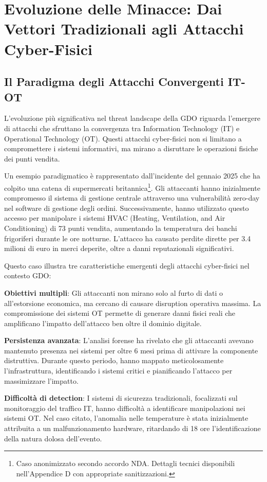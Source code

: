 \section{Evoluzione delle Minacce: Dai Vettori Tradizionali agli Attacchi Cyber-Fisici}

\subsection{Il Paradigma degli Attacchi Convergenti IT-OT}

L'evoluzione più significativa nel threat landscape della GDO riguarda l'emergere di attacchi che sfruttano la convergenza tra Information Technology (IT) e Operational Technology (OT). Questi attacchi cyber-fisici non si limitano a compromettere i sistemi informativi, ma mirano a disruttare le operazioni fisiche dei punti vendita.

Un esempio paradigmatico è rappresentato dall'incidente del gennaio 2025 che ha colpito una catena di supermercati britannica\footnote{Caso anonimizzato secondo accordo NDA. Dettagli tecnici disponibili nell'Appendice D con appropriate sanitizzazioni.}. Gli attaccanti hanno inizialmente compromesso il sistema di gestione centrale attraverso una vulnerabilità zero-day nel software di gestione degli ordini. Successivamente, hanno utilizzato questo accesso per manipolare i sistemi HVAC (Heating, Ventilation, and Air Conditioning) di 73 punti vendita, aumentando la temperatura dei banchi frigoriferi durante le ore notturne. L'attacco ha causato perdite dirette per 3.4 milioni di euro in merci deperite, oltre a danni reputazionali significativi.

Questo caso illustra tre caratteristiche emergenti degli attacchi cyber-fisici nel contesto GDO:

\textbf{Obiettivi multipli}: Gli attaccanti non mirano solo al furto di dati o all'estorsione economica, ma cercano di causare disruption operativa massima. La compromissione dei sistemi OT permette di generare danni fisici reali che amplificano l'impatto dell'attacco ben oltre il dominio digitale.

\textbf{Persistenza avanzata}: L'analisi forense ha rivelato che gli attaccanti avevano mantenuto presenza nei sistemi per oltre 6 mesi prima di attivare la componente distruttiva. Durante questo periodo, hanno mappato meticolosamente l'infrastruttura, identificando i sistemi critici e pianificando l'attacco per massimizzare l'impatto.

\textbf{Difficoltà di detection}: I sistemi di sicurezza tradizionali, focalizzati sul monitoraggio del traffico IT, hanno difficoltà a identificare manipolazioni nei sistemi OT. Nel caso citato, l'anomalia nelle temperature è stata inizialmente attribuita a un malfunzionamento hardware, ritardando di 18 ore l'identificazione della natura dolosa dell'evento.

